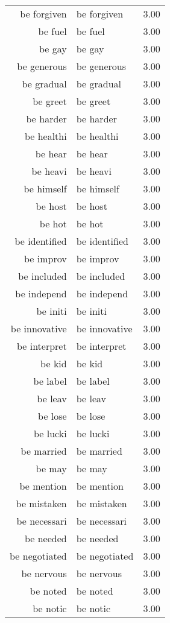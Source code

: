 \begin{table}[ht]
\begin{tabular}{rlr}
  be forgiven & be forgiven & 3.00 \\ 
  be fuel & be fuel & 3.00 \\ 
  be gay & be gay & 3.00 \\ 
  be generous & be generous & 3.00 \\ 
  be gradual & be gradual & 3.00 \\ 
  be greet & be greet & 3.00 \\ 
  be harder & be harder & 3.00 \\ 
  be healthi & be healthi & 3.00 \\ 
  be hear & be hear & 3.00 \\ 
  be heavi & be heavi & 3.00 \\ 
  be himself & be himself & 3.00 \\ 
  be host & be host & 3.00 \\ 
  be hot & be hot & 3.00 \\ 
  be identified & be identified & 3.00 \\ 
  be improv & be improv & 3.00 \\ 
  be included & be included & 3.00 \\ 
  be independ & be independ & 3.00 \\ 
  be initi & be initi & 3.00 \\ 
  be innovative & be innovative & 3.00 \\ 
  be interpret & be interpret & 3.00 \\ 
  be kid & be kid & 3.00 \\ 
  be label & be label & 3.00 \\ 
  be leav & be leav & 3.00 \\ 
  be lose & be lose & 3.00 \\ 
  be lucki & be lucki & 3.00 \\ 
  be married & be married & 3.00 \\ 
  be may & be may & 3.00 \\ 
  be mention & be mention & 3.00 \\ 
  be mistaken & be mistaken & 3.00 \\ 
  be necessari & be necessari & 3.00 \\ 
  be needed & be needed & 3.00 \\ 
  be negotiated & be negotiated & 3.00 \\ 
  be nervous & be nervous & 3.00 \\ 
  be noted & be noted & 3.00 \\ 
  be notic & be notic & 3.00 \\ 

\end{tabular}
\end{table}
